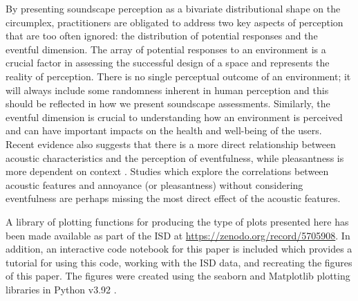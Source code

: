 By presenting soundscape perception as a bivariate distributional shape on the circumplex, practitioners are obligated to address two key aspects of perception that are too often ignored: the distribution of potential responses and the eventful dimension. The array of potential responses to an environment is a crucial factor in assessing the successful design of a space and represents the reality of perception. There is no single perceptual outcome of an environment; it will always include some randomness inherent in human perception and this should be reflected in how we present soundscape assessments. Similarly, the eventful dimension is crucial to understanding how an environment is perceived and can have important impacts on the health and well-being of the users. Recent evidence also suggests that there is a more direct relationship between acoustic characteristics and the perception of eventfulness, while pleasantness is more dependent on context \citep{Mitchell2021Investigating}. Studies which explore the correlations between acoustic features and annoyance (or pleasantness) without considering eventfulness are perhaps missing the most direct effect of the acoustic features.

A library of plotting functions for producing the type of plots presented here has been made available as part of the ISD at \href{https://zenodo.org/record/5705908}{https://zenodo.org/record/5705908}. In addition, an interactive code notebook for this paper is included which provides a tutorial for using this code, working with the ISD data, and recreating the figures of this paper. The figures were created using the seaborn \citep{Waskom2021seaborn} and Matplotlib \citep{Hunter2007Matplotlib} plotting libraries in Python v3.92 \citep{VanRossum2009}.



